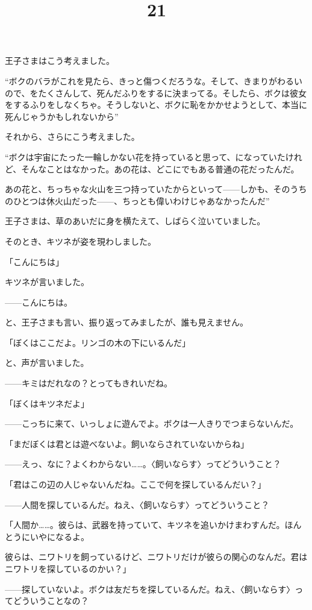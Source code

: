 王子さまはこう考えました。

“ボクのバラがこれを見たら、きっと傷つくだろうな。そして、きまりがわるいので、をたくさんして、死んだふりをするに決まってる。そしたら、ボクは彼女をするふりをしなくちゃ。そうしないと、ボクに恥をかかせようとして、本当に死んじゃうかもしれないから”

それから、さらにこう考えました。

“ボクは宇宙にたった一輪しかない花を持っていると思って、になっていたけれど、そんなことはなかった。あの花は、どこにでもある普通の花だったんだ。

あの花と、ちっちゃな火山を三つ持っていたからといって——しかも、そのうちのひとつは休火山だった——、ちっとも偉いわけじゃあなかったんだ”

王子さまは、草のあいだに身を横たえて、しばらく泣いていました。


\title{21}


そのとき、キツネが姿を現わしました。

「こんにちは」

キツネが言いました。

——こんにちは。

と、王子さまも言い、振り返ってみましたが、誰も見えません。

「ぼくはここだよ。リンゴの木の下にいるんだ」

と、声が言いました。

——キミはだれなの？とってもきれいだね。

「ぼくはキツネだよ」

——こっちに来て、いっしょに遊んでよ。ボクは一人きりでつまらないんだ。

「まだぼくは君とは遊べないよ。飼いならされていないからね」

——えっ、なに？よくわからない……。〈飼いならす〉ってどういうこと？

「君はこの辺の人じゃないんだね。ここで何を探しているんだい？」

——人間を探しているんだ。ねえ、〈飼いならす〉ってどういうこと？

「人間か……。彼らは、武器を持っていて、キツネを追いかけまわすんだ。ほんとうにいやになるよ。

彼らは、ニワトリを飼っているけど、ニワトリだけが彼らの関心のなんだ。君はニワトリを探しているのかい？」

——探していないよ。ボクは友だちを探しているんだ。ねえ、〈飼いならす〉ってどういうことなの？

